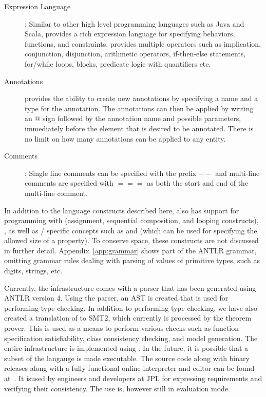 \begin{description}
\item [Expression Language]: Similar to other high level programming
  languages such as Java and Scala, \Klang{} provides a rich
  expression language for specifying behaviors, functions, and
  constraints. \Klang{} provides multiple operators such as
  implication, conjunction, disjunction, arithmetic operators,
  if-then-else statements, for/while loops, blocks, predicate logic
  with quantifiers etc. 

\item [Annotations] \Klang{} provides the ability to create new
  annotations by specifying a name and a type for the annotation. The
  annotations can then be applied by writing an $@$ sign followed by
  the annotation name and possible parameters, immediately before the 
  element that is desired to be annotated. There is no limit on how many 
  annotations can be applied to any entity. 

\item [Comments]: Single line comments can be specified with the
  prefix $--$ and multi-line comments are specified with $===$ as both
  the start and end of the multi-line comment.

\end{description}

In addition to the language constructs described here, \Klang{} also
has support for programming with  (assignment,
sequential composition, and looping constructs), , as well as \sysml{}/\uml{} specific concepts such as
 and  (which can be used for
specifying the allowed size of a property).  To conserve space, these
constructs are not discussed in further detail.
Appendix~\ref{app:grammar} shows part of the \Klang{} ANTLR grammar,
omitting grammar rules dealing with parsing of values of primitive
types, such as digits, strings, etc.

Currently, the \Klang{} infrastructure comes with a parser that has
been generated using ANTLR version 4. Using the parser, an AST is
created that is used for performing type checking. In addition to
performing type checking, we have also created a translation of
\Klang{} to SMT2, which currently is processed by the \zthree{}
theorem prover.  This is used as a means to perform various checks
such as function specification satisfiability, class consistency
checking, and model generation. The entire \Klang{} infrastructure is
implemented using \scala. In the future, it is possible that a subset
of the langauge is made executable. The source code along with binary
releases along with a fully functional online interpreter and \Klang{}
editor can be found at~\cite{theklanguage}. It isused by engineers and
developers at JPL for expressing requirements and verifying their
consistency. The use is, however still in evaluation mode.

 

